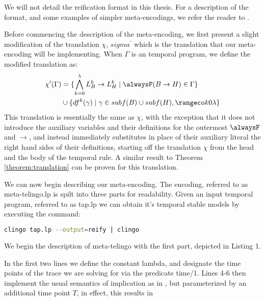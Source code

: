 We will not detail the reification format in this thesis. For a
description of the format, and some examples of simpler
meta-encodings, we refer the reader to \cite{karoscwa21a}.

Before commencing the description of the meta-encoding, we first
present a slight modification of the translation $\chi$,
$sigma^{\prime}$ which is the translation that our meta-encoding will
be implementing. When $\Gamma$ is an temporal program, we define the modified
translation as:
\begin{align*}
\chi^{\prime}(\Gamma) & = \{ \bigwedge_{k=0}^{\lambda} L_B^k
\rightarrow L_H^k \mid \alwaysF(B \rightarrow H) \in \Gamma \} \\
& \cup \{ df^k(\gamma) \mid \gamma \in subf(B) \cup subf(H), \kinlambda \}
\end{align*}
This translation is essentially the same as $\chi$, with the
exception that it does not introduce the auxiliary variables and their
definitions for the outermost $\alwaysF$ and $\rightarrow$, and
instead immediately substitutes in place of their auxiliary literal
the right hand sides of their definitions, starting off the
translation $\chi$ from the head and the body of the temporal rule. A similar
result to Theorem \ref{theorem:translation} can be proven for this
translation.

We can now begin describing our meta-encoding. The encoding, referred
to as meta-telingo.lp is spilt into three parts for readability. Given
an input temporal program, referred to as tap.lp we can obtain it's temporal stable
models by executing the command:

\begin{lstlisting}[language=bash,numbers=none]
clingo tap.lp --output=reify | clingo
\end{lstlisting}

 We begin the description of meta-telingo with the first part,
 depicted in Listing 1.

 In the first two lines we define the constant lambda, and designate
 the time points of the trace we are solving for via the predicate
 time/1. Lines 4-6 then implement the usual semantics of implication
 as in \cite{karoscwa21a}, but parameterized by an additional time
 point $T$, in effect, this results in

